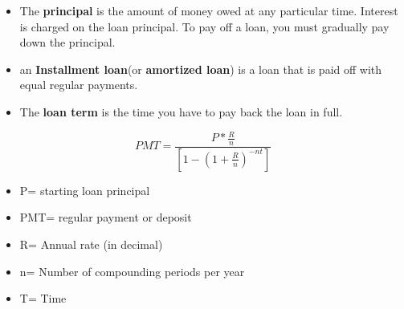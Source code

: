 \documentclass{article}
\begin{document}
	\begin{itemize}
		\item The \textbf{principal} is the amount of money owed at any particular time. Interest is charged on the loan principal. To pay off a loan, you must gradually pay down the principal.
		\item an \textbf{Installment loan}(or \textbf{amortized loan}) is a loan that is paid off with equal regular payments.
		\item The \textbf{loan term} is the time you have to pay back the loan in full.
	\end{itemize}
\begin{equation}
PMT = \frac{P*\frac{R}{n}}{[1-(1+\frac{R}{n})^{-nt}]}
\end{equation}
\begin{itemize}
	\item P= starting loan principal
	\item PMT= regular payment or deposit
	\item R= Annual rate (in decimal)
	\item n= Number of compounding periods per year
	\item T= Time
\end{itemize}
\end{document}
